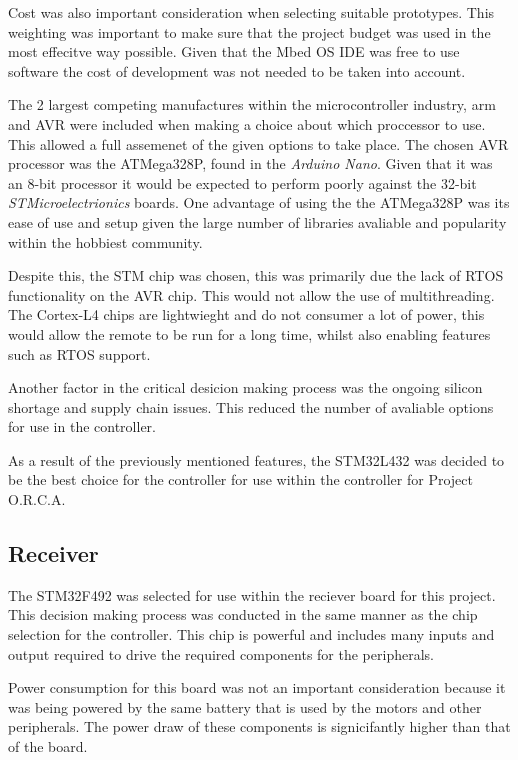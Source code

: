 \documentclass [11pt]{article}
\begin{document}
Cost was also important consideration when selecting suitable prototypes. This weighting was important to make sure that the project budget was used in the most effecitve way possible. Given that the Mbed OS IDE was free to use software the cost of development was not needed to be taken into account. 

The 2 largest competing manufactures within the microcontroller industry, \gls{arm} and AVR were included when making a choice about which proccessor to use. This allowed a full assemenet of the given options to take place. The chosen AVR processor was the ATMega328P, found in the \textit{Arduino Nano}. Given that it was an 8-bit processor it would be expected to perform poorly against the 32-bit \textit{STMicroelectrionics} boards. One advantage of using the the ATMega328P was its ease of use and setup given the large number of libraries avaliable and popularity within the hobbiest community. 

Despite this, the STM chip was chosen, this was primarily due the lack of RTOS functionality on the AVR chip. This would not allow the use of multithreading. The Cortex-L4 chips are lightwieght and do not consumer a lot of power, this would allow the remote to be run for a long time, whilst also enabling features such as RTOS support. 

Another factor in the critical desicion making process was the ongoing silicon shortage and supply chain issues. This reduced the number of avaliable options for use in the controller.  

As a result of the previously mentioned features, the STM32L432 was decided to be the best choice for the controller for use within the controller for Project O.R.C.A.    

\subsection{Receiver}

The STM32F492 was selected for use within the reciever board for this project. This decision making process was conducted in the same manner as the chip selection for the controller. This chip is powerful and includes many inputs and output required to drive the required components for the peripherals.

Power consumption for this board was not an important consideration because it was being powered by the same battery that is used by the motors and other peripherals. The power draw of these components is signicifantly higher than that of the board.
\end{document}
